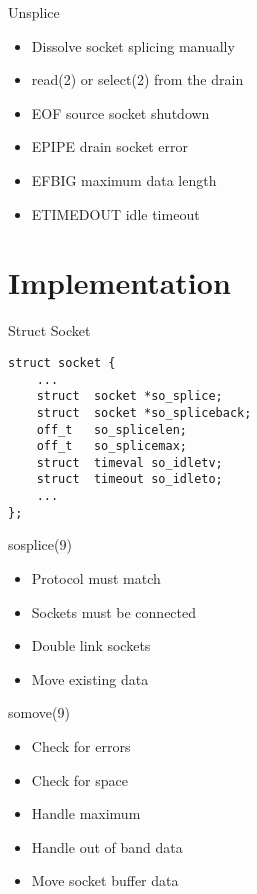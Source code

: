 \documentclass[14pt]{beamer}
\begin{document}
\begin{frame}{Unsplice}
\begin{itemize}
    \item Dissolve socket splicing manually
    \item read(2) or select(2) from the drain
    \item EOF source socket shutdown
    \item EPIPE drain socket error
    \item EFBIG maximum data length
    \item ETIMEDOUT idle timeout
\end{itemize}
\end{frame}

\section{Implementation}

\begin{frame}[fragile]{Struct Socket}
\begin{verbatim}
struct socket {
    ...
    struct  socket *so_splice;
    struct  socket *so_spliceback;
    off_t   so_splicelen;
    off_t   so_splicemax;
    struct  timeval so_idletv;
    struct  timeout so_idleto;
    ...
};
\end{verbatim}
\end{frame}

\begin{frame}{sosplice(9)}
\begin{itemize}
    \item Protocol must match
    \item Sockets must be connected
    \item Double link sockets
    \item Move existing data
\end{itemize}
\end{frame}

\begin{frame}{somove(9)}
\begin{itemize}
    \item Check for errors
    \item Check for space
    \item Handle maximum
    \item Handle out of band data
    \item Move socket buffer data
\end{itemize}
\end{frame}
\end{document}
